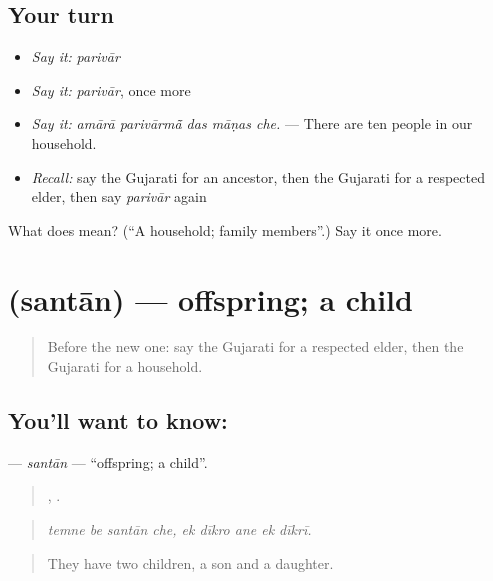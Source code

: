 \subsection*{Your turn}
\begin{itemize}
\raggedright
  \item \emph{Say it:} \emph{parivār}
  \item \emph{Say it:} \emph{parivār}, once more
  \item \emph{Say it:} \emph{amārā parivārmā̃ das māṇas che.} — There are ten people in our household.
  \item \emph{Recall:} say the Gujarati for an ancestor, then the Gujarati for a respected elder, then say \emph{parivār} again
\end{itemize}

\begin{tcolorbox}[breakable,colback=teal!4,colframe=teal!35!black,title={Before you move on}]
What does  mean? (\textquotedblleft{}A household; family members\textquotedblright{}.) Say it once more.
\end{tcolorbox}
\section[\texorpdfstring{\gu{સંતાન} (santān)}{સંતાન (santān)}]{ (santān) — offspring; a child}

\label{lesson:GU-C493-santan}



\begin{quote}
Before the new one: say the Gujarati for a respected elder, then the Gujarati for a household.
\end{quote}

\subsection*{You'll want to know: }
\textbf{} — \emph{santān} — \textquotedblleft{}offspring; a child\textquotedblright{}.

\begin{quote}
   ,     .
\end{quote}

\begin{quote}
\emph{temne be santān che, ek dīkro ane ek dīkrī.}
\end{quote}

\begin{quote}
They have two children, a son and a daughter.
\end{quote}

